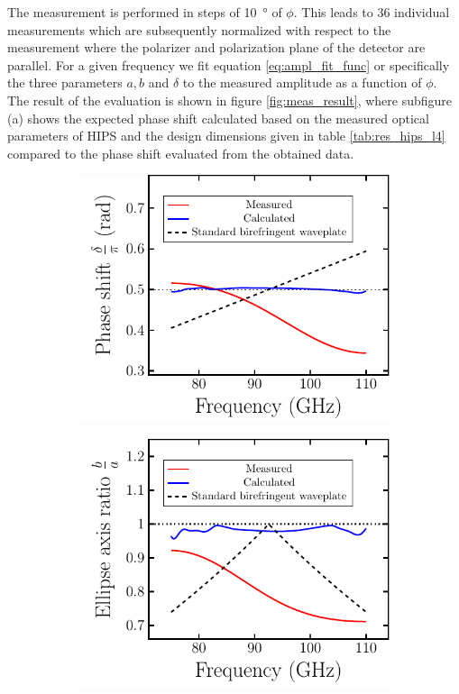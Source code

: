 The measurement is performed in steps of \SI{10}{\degree} of $\phi$. This leads to 36 individual measurements which are subsequently normalized with respect to the measurement where the polarizer and polarization plane of the detector are parallel. For a given frequency we fit equation \ref{eq:ampl_fit_func} or specifically the three parameters $a,b$ and $\delta$ to the measured amplitude as a function of $\phi$. The result of the evaluation is shown in figure \ref{fig:meas_result}, where subfigure (a) shows the expected phase shift calculated based on the measured optical parameters of HIPS and the design dimensions given in table \ref{tab:res_hips_l4} compared to the phase shift evaluated from the obtained data. 

\begin{figure}[H]
    \begin{subfigure}[b]{.5\linewidth}
    \caption{}\label{}
    \centering\includegraphics[scale=0.65]{images/results/plots/polymer/measurement_result_a.pdf}
    \end{subfigure}%
    \begin{subfigure}[b]{.5\linewidth}
    \caption{}\label{}
    \centering\includegraphics[scale=0.65]{images/results/plots/polymer/measurement_result_b.pdf}

\end{subfigure}
\end{figure}
